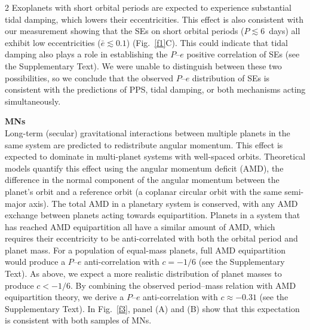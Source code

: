 \documentclass[10pt]{article}
\begin{document}
\begin{multicols}{2}
Exoplanets with short orbital periods are expected to experience substantial tidal damping, which lowers their eccentricities.
This effect is also consistent with our measurement showing that the SEs on short orbital periods ($P \lesssim 6$~days) all exhibit low eccentricities ($\bar{e} \lesssim 0.1$) (Fig.~\ref{f1}C).
This could indicate that tidal damping also plays a role in establishing the $P$--$e$ positive correlation of SEs  (see the Supplementary Text).
We were unable to distinguish between these two possibilities, so we conclude that the observed $P$--$e$ distribution of SEs is consistent with the predictions of PPS, tidal damping, or both mechanisms acting simultaneously.

{\noindent \bf MNs}\\
Long-term (secular) gravitational interactions between multiple planets in the same system are predicted to redistribute angular momentum.
This effect is expected to dominate in multi-planet systems with well-spaced orbits\cite{2011ApJ...735..109W,2017A&A...605A..72L}.
Theoretical models quantify this effect using the angular momentum deficit (AMD), the difference in the normal component of the angular momentum between the planet's orbit and a reference orbit (a coplanar circular orbit with the same semi-major axis)\cite{1997A&A...317L..75L,2017A&A...605A..72L}.
The total AMD in a planetary system is conserved, with any AMD exchange between planets acting towards equipartition\cite{2011ApJ...735..109W}.
Planets in a system that has reached AMD equipartition all have a similar amount of AMD, which requires their eccentricity to be anti-correlated with both the orbital period and planet mass\cite{2011ApJ...735..109W,2016ApJ...832...34M,2017A&A...605A..72L}.
For a population of equal-mass planets, full AMD equipartition would produce a $P$--$e$ anti-correlation with $c=-1/6$ (see the Supplementary Text).
As above, we expect a more realistic distribution of planet masses to produce $c<-1/6$.
By combining the observed period--mass relation with AMD equipartition theory, we derive a $P$--$e$ anti-correlation with $c\approx-0.31$ (see the Supplementary Text).
In Fig.~\ref{f3}, panel (A) and (B) show that this expectation is consistent with both samples of MNs.


\end{multicols}
\end{document}
